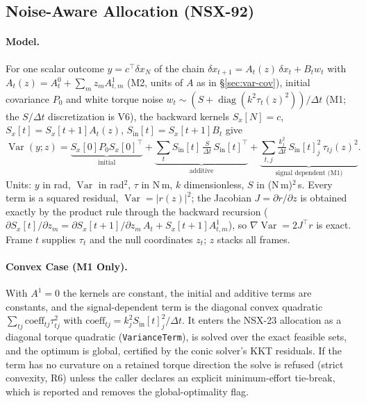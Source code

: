 \documentclass[11pt,a4paper]{article}
\begin{document}
\subsection{Noise-Aware Allocation (NSX-92)}
\label{sec:var-noise-aware}

\paragraph{Model.}  For one scalar outcome $y=c^{\top}\delta x_N$ of the chain
$\delta x_{t+1}=A_t(z)\,\delta x_t+B_t w_t$ with $A_t(z)=A_t^0+\sum_m z_m A_{t,m}^1$
(M2, units of $A$ as in \S\ref{sec:var-cov}), initial covariance $P_0$ and white
torque noise $w_t\sim(S+\operatorname{diag}(k^2\tau_t(z)^2))/\Delta t$ (M1; the
$S/\Delta t$ discretization is V6), the backward kernels
$S_x[N]=c$, $S_x[t]=S_x[t+1]A_t(z)$, $S_{\mathrm{in}}[t]=S_x[t+1]B_t$ give
\begin{equation}
\operatorname{Var}(y;z)=
\underbrace{S_x[0]P_0S_x[0]^{\top}}_{\text{initial}}+
\underbrace{\sum_t S_{\mathrm{in}}[t]\,\tfrac{S}{\Delta t}\,S_{\mathrm{in}}[t]^{\top}}_{\text{additive}}+
\underbrace{\sum_{t,j}\tfrac{k_j^2}{\Delta t}\,S_{\mathrm{in}}[t]_j^2\,\tau_{tj}(z)^2}_{\text{signal dependent (M1)}} .
\end{equation}
Units: $y$ in rad, $\operatorname{Var}$ in rad$^2$, $\tau$ in N\,m, $k$ dimensionless,
$S$ in (N\,m)$^2\,$s.  Every term is a squared residual,
$\operatorname{Var}=\lvert r(z)\rvert^2$; the Jacobian $J=\partial r/\partial z$
is obtained exactly by the product rule through the backward recursion
($\partial S_x[t]/\partial z_m=\partial S_x[t+1]/\partial z_m\,A_t+S_x[t+1]A^1_{t,m}$),
so $\nabla\operatorname{Var}=2J^{\top}r$ is exact.  Frame $t$ supplies $\tau_t$
and the null coordinates $z_t$; $z$ stacks all frames.

\paragraph{Convex Case (M1 Only).}  With $A^1=0$ the kernels are constant, the
initial and additive terms are constants, and the signal-dependent term is the
diagonal convex quadratic $\sum_{tj}\mathrm{coeff}_{tj}\tau_{tj}^2$ with
$\mathrm{coeff}_{tj}=k_j^2S_{\mathrm{in}}[t]_j^2/\Delta t$.  It enters the
NSX-23 allocation as a diagonal torque quadratic (\texttt{VarianceTerm}), is
solved over the exact feasible sets, and the optimum is global, certified by
the conic solver's KKT residuals.  If the term has no curvature on a retained
torque direction the solve is refused (strict convexity, R6) unless the caller
declares an explicit minimum-effort tie-break, which is reported and removes
the global-optimality flag.
\end{document}
